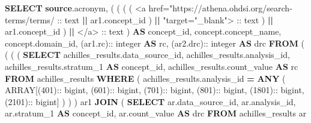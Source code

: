 \documentclass[
]{book}
\newenvironment{Shaded}{\begin{snugshade}}{\end{snugshade}}
\newcommand{\DataTypeTok}[1]{\textcolor[rgb]{0.13,0.29,0.53}{#1}}
\newcommand{\DecValTok}[1]{\textcolor[rgb]{0.00,0.00,0.81}{#1}}
\newcommand{\KeywordTok}[1]{\textcolor[rgb]{0.13,0.29,0.53}{\textbf{#1}}}
\newcommand{\NormalTok}[1]{#1}
\newcommand{\OperatorTok}[1]{\textcolor[rgb]{0.81,0.36,0.00}{\textbf{#1}}}
\newcommand{\StringTok}[1]{\textcolor[rgb]{0.31,0.60,0.02}{#1}}
\begin{document}
\begin{Shaded}
\begin{Highlighting}[]
\KeywordTok{SELECT}
  \KeywordTok{source}\NormalTok{.acronym,}
\NormalTok{  (}
\NormalTok{    (}
\NormalTok{      (}
\NormalTok{        (}
\StringTok{\textquotesingle{}\textless{}a href="https://athena.ohdsi.org/search{-}terms/terms/\textquotesingle{}}\NormalTok{ :: text}
          \OperatorTok{||}\NormalTok{ ar1.concept\_id}
\NormalTok{        ) }\OperatorTok{||} \StringTok{\textquotesingle{}"target="\_blank"\textgreater{}\textquotesingle{}}\NormalTok{ :: text}
\NormalTok{      ) }\OperatorTok{||}\NormalTok{ ar1.concept\_id}
\NormalTok{    ) }\OperatorTok{||} \StringTok{\textquotesingle{}\textless{}/a\textgreater{}\textquotesingle{}}\NormalTok{ :: text}
\NormalTok{  ) }\KeywordTok{AS}\NormalTok{ concept\_id,}
\NormalTok{  concept.concept\_name,}
\NormalTok{  concept.domain\_id,}
\NormalTok{  (ar1.rc):: }\DataTypeTok{integer} \KeywordTok{AS}\NormalTok{ rc,}
\NormalTok{  (ar2.drc):: }\DataTypeTok{integer} \KeywordTok{AS}\NormalTok{ drc}
\KeywordTok{FROM}
\NormalTok{  (}
\NormalTok{    (}
\NormalTok{      (}
\NormalTok{        (}
          \KeywordTok{SELECT}
\NormalTok{            achilles\_results.data\_source\_id,}
\NormalTok{            achilles\_results.analysis\_id,}
\NormalTok{            achilles\_results.stratum\_1 }\KeywordTok{AS}\NormalTok{ concept\_id,}
\NormalTok{            achilles\_results.count\_value }\KeywordTok{AS}\NormalTok{ rc}
          \KeywordTok{FROM}
\NormalTok{            achilles\_results}
          \KeywordTok{WHERE}
\NormalTok{            (}
\NormalTok{              achilles\_results.analysis\_id }\OperatorTok{=} \KeywordTok{ANY}\NormalTok{ (}
                \DataTypeTok{ARRAY}\NormalTok{[(}\DecValTok{401}\NormalTok{):: bigint,}
\NormalTok{                (}\DecValTok{601}\NormalTok{):: bigint,}
\NormalTok{                (}\DecValTok{701}\NormalTok{):: bigint,}
\NormalTok{                (}\DecValTok{801}\NormalTok{):: bigint,}
\NormalTok{                (}\DecValTok{1801}\NormalTok{):: bigint,}
\NormalTok{                (}\DecValTok{2101}\NormalTok{):: bigint]}
\NormalTok{              )}
\NormalTok{            )}
\NormalTok{        ) ar1}
        \KeywordTok{JOIN}\NormalTok{ (}
          \KeywordTok{SELECT}
\NormalTok{            ar.data\_source\_id,}
\NormalTok{            ar.analysis\_id,}
\NormalTok{            ar.stratum\_1 }\KeywordTok{AS}\NormalTok{ concept\_id,}
\NormalTok{            ar.count\_value }\KeywordTok{AS}\NormalTok{ drc}
          \KeywordTok{FROM}
\NormalTok{            achilles\_results ar}

\end{Highlighting}
\end{Shaded}
\end{document}
